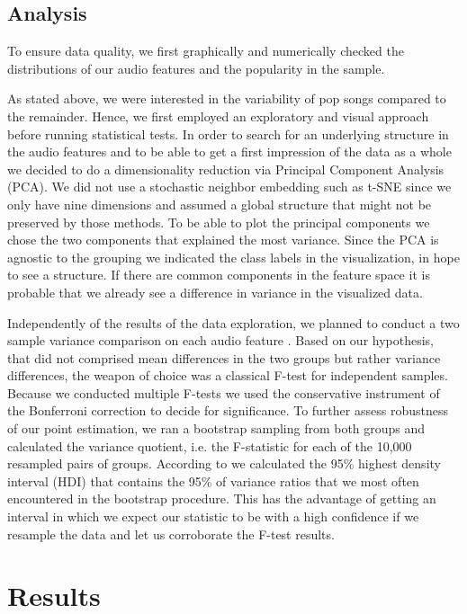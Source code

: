 \documentclass{article}
\begin{document}
\subsection{Analysis}
To ensure data quality, we first graphically and numerically checked the distributions of our audio features and the popularity in the sample.

As stated above, we were interested in the variability of pop songs compared to the remainder. Hence, we first employed an exploratory and visual approach before running statistical tests. In order to search for an underlying structure in the audio features and to be able to get a first impression of the data as a whole we decided to do a dimensionality reduction via Principal Component Analysis (PCA). We did not use a stochastic neighbor embedding such as t-SNE since we only have nine dimensions and assumed a global structure that might not be preserved by those methods. To be able to plot the principal components we chose the two components that explained the most variance. Since the PCA is agnostic to the grouping we indicated the class labels in the visualization, in hope to see a structure. If there are common components in the feature space it is probable that we already see a difference in variance in the visualized data.

Independently of the results of the data exploration, we planned to conduct a two sample variance comparison on each audio feature \citep{snedecor1989}. Based on our hypothesis, that did not comprised mean differences in the two groups but rather variance differences, the weapon of choice was a classical F-test for independent samples. Because we conducted multiple F-tests we used the conservative instrument of the Bonferroni correction to decide for significance. To further assess robustness of our point estimation, we ran a bootstrap sampling from both groups and calculated the variance quotient, i.e. the F-statistic for each of the 10,000 resampled pairs of groups. According to \cite{kruschke2014doing}
we calculated the 95\% highest density interval (HDI) that contains the 95\% of variance ratios that we most often encountered in the bootstrap procedure. This has the advantage of getting an interval in which we expect our statistic to be with a high confidence if we resample the data and let us corroborate the F-test results.

\section{Results}
\end{document}
